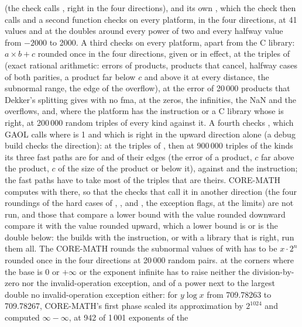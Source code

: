 (the  check calls , right in the four directions),
and its own , which the  check then calls and
a second function checks on every platform, in the four directions, at 41
values and at the doubles around every power of two and every halfway value from
$-2000$ to 2000. A third checks  on every platform, apart
from the C library: $a\times b + c$ rounded once in the four directions, given
or in effect, at the triples of  (exact rational
arithmetic: errors of products, products that cancel, halfway cases of both
parities, a product far below $c$ and above it at every distance, the
subnormal range, the edge of the overflow), at the error of 20\,000 products
that Dekker's splitting gives with no fma, at the zeros, the infinities, the NaN
and the overflows, and, where the platform has the instruction or a C library
whose  is right, at 200\,000 random triples of every kind against
it. A fourth checks , which GAOL calls where
 is 1 and which is right in the upward direction alone (a
debug build checks the direction): at the triples of , then
at 900\,000 triples of the kinds its three fast paths are for and of their edges
(the error of a product, $c$ far above the product, $c$ of the size of the
product or below it), against  and the instruction;
the fast paths have to take most of the triples that are theirs. CORE-MATH
computes with  there, so that the checks that call it
in another direction (the four roundings of the hard cases of ,
,  and , the exception flags,  at the
limits) are not run, and those that compare a lower bound with the value rounded
downward compare it with the value rounded upward, which a lower bound is or is
the double below: the builds with the instruction, or with a library
 that is right, run them all. The  CORE-MATH
rounds the subnormal values of  with has to be $x\cdot2^n$
rounded once in the four directions at 20\,000 random pairs.  at
the corners where the base is 0 or $+\infty$ or the exponent infinite has to
raise neither the division-by-zero nor the invalid-operation exception, and  of a power next to the largest double no
invalid-operation exception either: for $y\log x$ from
709.78263 to 709.78267, CORE-MATH's first phase scaled its approximation by
$2^{1024}$ and computed $\infty-\infty$, at 942 of 1\,001 exponents of the
